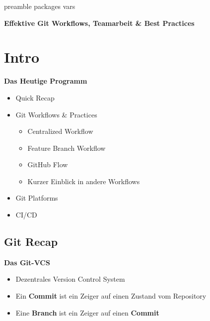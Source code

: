 \RequirePackage{import}
{preamble}
{packages}
{vars}

    \begin{frame}[c]
        \centering
        \Large
        \textbf{Effektive Git Workflows, Teamarbeit \& Best Practices}
    \end{frame}


    \section{Intro}\label{sec:intro}
    \begin{frame}[c]
        \slidehead
        \vspace{-1em}
        \centering
        \large
        \textbf{Das Heutige Programm}
        \vspace{1em}
        \begin{itemize}[<+->]
            \item Quick Recap
            \item Git Workflows \& Practices
                \begin{itemize}
                    \item Centralized Workflow
                    \item Feature Branch Workflow
                    \item GitHub Flow
                    \item Kurzer Einblick in andere Workflows
                \end{itemize}
            \item Git Platforms
            \item CI/CD
        \end{itemize}
    \end{frame}

    \subsection{Git Recap}\label{subsec:git-recap}
    \begin{frame}[c]
        \slidehead
        \vspace{-1em}
        \centering
        \large
        \textbf{Das Git-VCS}
        \vspace{1em}
        \begin{itemize}[<+->]
            \item Dezentrales Version Control System
            \item Ein \textbf{Commit} ist ein Zeiger auf einen Zustand vom Repository
            \item Eine \textbf{Branch} ist ein Zeiger auf einen \textbf{Commit}
        \end{itemize}
    \end{frame}

